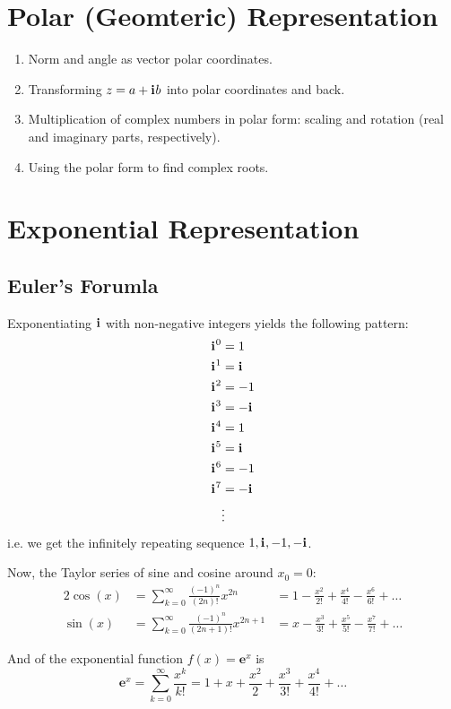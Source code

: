\documentclass{article}
\newcommand{\iu}{\mathbf{i}\mkern1mu}
\newcommand{\Eu}[1]{\mathbf{e}^{#1}}
\begin{document}
\section{Polar (Geomteric) Representation}
\begin{enumerate}
	\item Norm and angle as vector polar coordinates.
	\item Transforming $z=a+\iu b$ into polar coordinates and back.
	\item Multiplication of complex numbers in polar form: scaling and rotation (real and imaginary parts, respectively).
	\item Using the polar form to find complex roots.
\end{enumerate}

\section{Exponential Representation}
\subsection{Euler's Forumla}
Exponentiating $\iu$ with non-negative integers yields the following pattern:
\begin{align*}
	\iu^0 & = 1    \\
	\iu^1 & = \iu  \\
	\iu^2 & = -1   \\
	\iu^3 & = -\iu \\
	\iu^4 & = 1    \\
	\iu^5 & = \iu  \\
	\iu^6 & = -1   \\
	\iu^7 & = -\iu \\
	      & \vdots
\end{align*}
i.e. we get the infinitely repeating sequence ${1, \iu, -1, -\iu}$.

Now, the Taylor series of sine and cosine around $x_{0}=0$:
\begin{alignat}{2}
	\cos(x) & = \sum\limits_{k=0}^{\infty} \frac{(-1)^{n}}{(2n)!}x^{2n}     & = 1 - \frac{x^2}{2!} + \frac{x^4}{4!} - \frac{x^6}{6!} + \dots \\
	\sin(x) & = \sum\limits_{k=0}^{\infty} \frac{(-1)^{n}}{(2n+1)!}x^{2n+1} & = x-\frac{x^3}{3!}+\frac{x^5}{5!} - \frac{x^7}{7!} + \dots
	\label{eq:cosine_and_sine_taylor}
\end{alignat}

And of the exponential function $f(x)=\Eu{x}$ is
\begin{equation}
	\Eu{x} = \sum\limits_{k=0}^{\infty} \frac{x^{k}}{k!} = 1 + x + \frac{x^2}{2} + \frac{x^3}{3!} + \frac{x^4}{4!} + \dots
	\label{eq:exp_taylor}
\end{equation}
\end{document}
